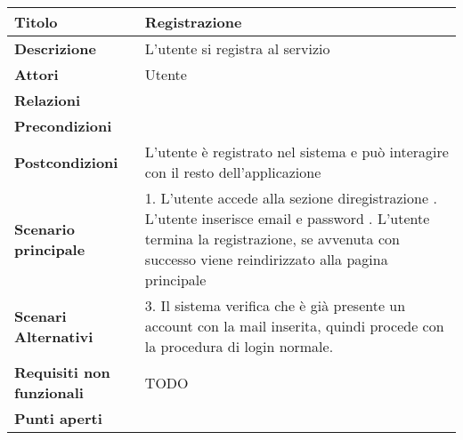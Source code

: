 \begin{tabular} {|P{4.5cm}|P{12.5cm}|}
  \hline
  \textbf{Titolo}                   & Registrazione                                                                            \\
  \hline
  \textbf{Descrizione}              & L'utente si registra al servizio                                                         \\
  \hline
  \textbf{Attori}                   & Utente                                                                                   \\
  \hline
  \textbf{Relazioni}                &                                                                                          \\
  \hline
  \textbf{Precondizioni}            &                                                                                          \\
  \hline
  \textbf{Postcondizioni}           & L'utente è registrato nel sistema e può interagire con il resto dell'applicazione        \\
  \hline
  \textbf{Scenario principale}      &
  1. L'utente accede alla sezione diregistrazione . L'utente inserisce email e  password . L'utente termina la registrazione, se avvenuta con successo viene reindirizzato alla pagina principale                    \\
  \hline
  \textbf{Scenari Alternativi}      &
  3. Il sistema verifica che è già presente un account con la mail inserita, quindi procede con la procedura di login normale. \\
  \hline
  \textbf{Requisiti non funzionali} & TODO                                                              \\
  \hline
  \textbf{Punti aperti}             &                                                                                          \\
  \hline
\end{tabular}
\hfill
\break


